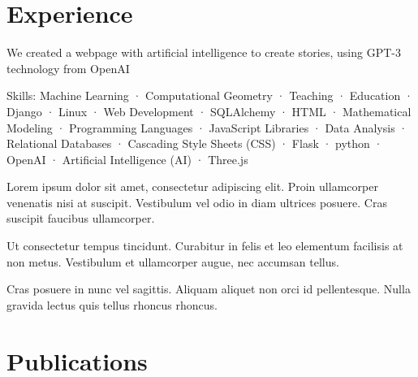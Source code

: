 \documentclass[]{plushcv}
\begin{document}
\begin{minipage}[t]{0.70\textwidth} 



\section{Experience}
\vspace{\topsep} %
\begin{tightemize}
\sectionsep
\item We created a webpage with artificial intelligence to create stories, using GPT-3 technology from OpenAI
\item Skills: Machine Learning · Computational Geometry · Teaching · Education · Django · Linux · Web Development · SQLAlchemy · HTML · Mathematical Modeling · Programming Languages · JavaScript Libraries · Data Analysis · Relational Databases · Cascading Style Sheets (CSS) · Flask · python · OpenAI · Artificial Intelligence (AI) · Three.js
\end{tightemize}
\sectionsep

\begin{tightemize}
\sectionsep
\item Lorem ipsum dolor sit amet, consectetur adipiscing elit. Proin ullamcorper venenatis nisi at suscipit. Vestibulum vel odio in diam ultrices posuere. Cras suscipit faucibus ullamcorper.
\item Ut consectetur tempus tincidunt. Curabitur in felis et leo elementum facilisis at non metus. Vestibulum et ullamcorper augue, nec accumsan tellus.
\item Cras posuere in nunc vel sagittis. Aliquam aliquet non orci id pellentesque. Nulla gravida lectus quis tellus rhoncus rhoncus.
\end{tightemize}
\sectionsep



\section{Publications}


\end{minipage}
\end{document}

